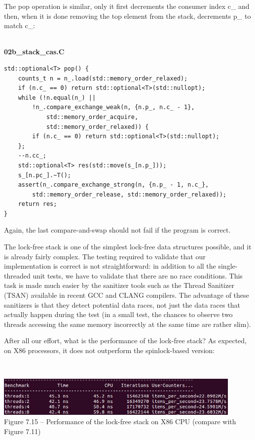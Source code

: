 The pop operation is similar, only it first decrements the consumer index c\_ and then, when it is done removing the top element from the stack, decrements p\_ to match c\_:

\hspace*{\fill} \\ %
\noindent
\textbf{02b\_stack\_cas.C}
\begin{lstlisting}[style=styleCXX]
std::optional<T> pop() {
	counts_t n = n_.load(std::memory_order_relaxed);
	if (n.c_ == 0) return std::optional<T>(std::nullopt);
	while (!n.equal(n_) ||
		!n_.compare_exchange_weak(n, {n.p_, n.c_ - 1},
			std::memory_order_acquire,
			std::memory_order_relaxed)) {
		if (n.c_ == 0) return std::optional<T>(std::nullopt);
	};
	--n.cc_;
	std::optional<T> res(std::move(s_[n.p_]));
	s_[n.pc_].~T();
	assert(n_.compare_exchange_strong(n, {n.p_ - 1, n.c_},
		std::memory_order_release, std::memory_order_relaxed));
	return res;
}
\end{lstlisting}

Again, the last compare-and-swap should not fail if the program is correct.

The lock-free stack is one of the simplest lock-free data structures possible, and it is already fairly complex. The testing required to validate that our implementation is correct is not straightforward: in addition to all the single-threaded unit tests, we have to validate that there are no race conditions. This task is made much easier by the sanitizer tools such as the Thread Sanitizer (TSAN) available in recent GCC and CLANG compilers. The advantage of these sanitizers is that they detect potential data races, not just the data races that actually happen during the test (in a small test, the chances to observe two threads accessing the same memory incorrectly at the same time are rather slim).

After all our effort, what is the performance of the lock-free stack? As expected, on X86 processors, it does not outperform the spinlock-based version:

\hspace*{\fill} \\ %
\begin{center}
\includegraphics[width=0.9\textwidth]{content/2/chapter7/images/15.jpg}\\ 
Figure 7.15 – Performance of the lock-free stack on X86 CPU (compare with Figure 7.11)
\end{center}

